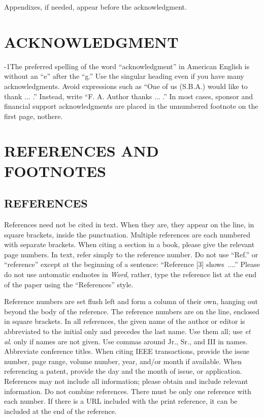 \documentclass{IEEEojcsys}
\begin{document}
Appendixes, if needed, appear before the acknowledgment.

\section*{ACKNOWLEDGMENT}

\looseness-1The preferred spelling of the word ``acknowledgment'' in American English is without an ``e'' after the ``g.'' Use the singular heading even if you have many acknowledgments. Avoid expressions such as ``One of us (S.B.A.) would like to thank ... .'' Instead, write ``F. A. Author thanks ... .'' In most cases, sponsor and financial support acknowledgments are placed in the unnumbered footnote on the first page, not\break here.

\section*{REFERENCES AND FOOTNOTES}

\subsection{REFERENCES}

References need not be cited in text. When they are, they appear on the line, in square brackets, inside the punctuation. Multiple references are each numbered with separate brackets. When citing a section in a book, please give the relevant page numbers. In text, refer simply to the reference number. Do not use ``Ref.'' or ``reference'' except at the beginning of a sentence: ``Reference [3] shows~....'' Please do not use automatic endnotes in {\it Word}, rather, type the reference list at the end of the paper using the ``References''  style.

Reference numbers are set flush left and form a column of their own, hanging out beyond the body of the reference. The reference numbers are on the line, enclosed in square brackets. In all references, the given name of the author or editor is abbreviated to the initial only and precedes the last name. Use them all; use {\it et al}. only if names are not given. Use commas around Jr., Sr., and III in names. Abbreviate conference titles. When citing IEEE transactions, provide the issue number, page range, volume number, year, and/or month if available. When referencing a patent, provide the day and the month of issue, or application. References may not include all information; please obtain and include relevant information. Do not combine references. There must be only one reference with each number. If there is a URL included with the print reference, it can be included at the end of the reference. 
\end{document}
